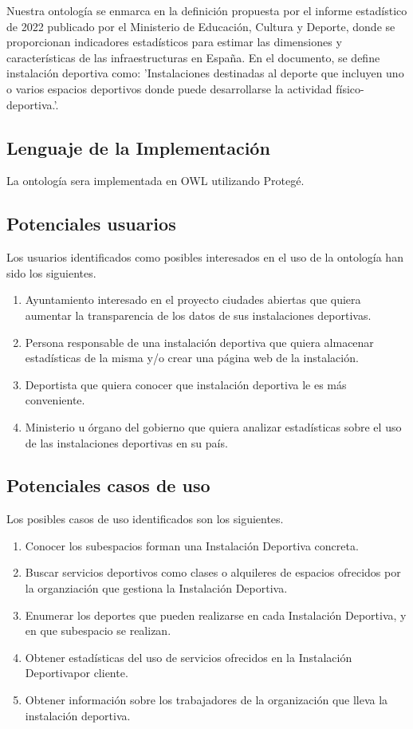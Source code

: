 \documentclass[a4paper,12pt]{article}
\begin{document}
	Nuestra ontología se enmarca en la definición propuesta por el informe estadístico de 2022 publicado por el Ministerio de Educación, Cultura y Deporte, donde se proporcionan indicadores estadísticos para estimar las dimensiones y características de las infraestructuras en España. En el documento, se define instalación deportiva como: 'Instalaciones destinadas al
deporte que incluyen uno o varios espacios
deportivos donde puede desarrollarse la actividad
físico-deportiva.'.
	
	\subsection{Lenguaje de la Implementación}
	La ontología sera implementada en OWL utilizando Protegé.
	
	\subsection{Potenciales usuarios}
	Los usuarios identificados como posibles interesados en el uso de la ontología han sido los siguientes.
	\begin{enumerate}
		\item Ayuntamiento interesado en el proyecto ciudades abiertas que quiera aumentar la transparencia de los datos de sus instalaciones deportivas.
		\item Persona responsable de una instalación deportiva que quiera almacenar estadísticas de la misma y/o crear una página web de la instalación.
		\item Deportista que quiera conocer que instalación deportiva le es más conveniente.
		\item Ministerio u órgano del gobierno que quiera analizar estadísticas sobre el uso de las instalaciones deportivas en su país.
	\end{enumerate}

	\subsection{Potenciales casos de uso}
	Los posibles casos de uso identificados son los siguientes.
	\begin{enumerate}
		\item Conocer los subespacios forman una Instalación Deportiva concreta.
		\item Buscar servicios deportivos como clases o alquileres de espacios ofrecidos por la organziación que gestiona la Instalación Deportiva.
		\item Enumerar los deportes que pueden realizarse en cada Instalación Deportiva, y en que subespacio se realizan.
		\item Obtener estadísticas del uso de servicios ofrecidos en la Instalación Deportivapor cliente.
		\item Obtener información sobre los trabajadores de la organización que lleva la instalación deportiva.
	\end{enumerate}
	
\end{document}
